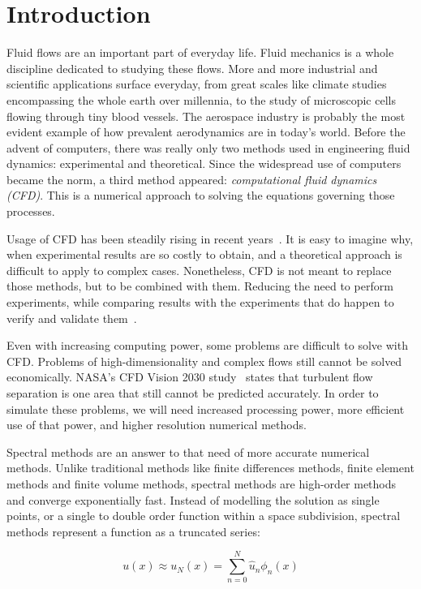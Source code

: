 \chapter{Introduction}
Fluid flows are an important part of everyday life. Fluid mechanics is a whole discipline dedicated
to studying these flows. More and more industrial and scientific applications surface everyday, from
great scales like climate studies encompassing the whole earth over millennia, to the study of
microscopic cells flowing through tiny blood vessels. The aerospace industry is probably the most
evident example of how prevalent aerodynamics are in today's world. Before the advent of computers,
there was really only two methods used in engineering fluid dynamics: experimental and theoretical.
Since the widespread use of computers became the norm, a third method appeared:
\textit{computational fluid dynamics (CFD)}. This is a numerical approach to solving the equations
governing those processes.

Usage of CFD has been steadily rising in recent years~\cite{Slotnick2014}. It is easy to imagine
why, when experimental results are so costly to obtain, and a theoretical approach is difficult to
apply to complex cases. Nonetheless, CFD is not meant to replace those methods, but to be combined
with them. Reducing the need to perform experiments, while comparing results with the experiments
that do happen to verify and validate them~\cite{Stern2001}.

Even with increasing computing power, some problems are difficult to solve with CFD. Problems of
high-dimensionality and complex flows still cannot be solved economically. NASA's CFD Vision 2030
study~\cite{Slotnick2014} states that turbulent flow separation is one area that still cannot be
predicted accurately. In order to simulate these problems, we will need increased processing power,
more efficient use of that power, and higher resolution numerical methods.

Spectral methods are an answer to that need of more accurate numerical methods. Unlike traditional
methods like finite differences methods, finite element methods and finite volume methods, spectral
methods are high-order methods and converge exponentially fast. Instead of modelling the solution as
single points, or a single to double order function within a space subdivision, spectral methods
represent a function as a truncated series:

\begin{equation}
	u(x) \approx u_N(x) = \sum_{n = 0}^{N} \widehat{u}_n \phi _n(x)
\end{equation}

